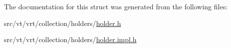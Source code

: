 The documentation for this struct was generated from the following files\+:\begin{DoxyCompactItemize}
\item 
src/vt/vrt/collection/holders/\hyperlink{vrt_2collection_2holders_2holder_8h}{holder.\+h}\item 
src/vt/vrt/collection/holders/\hyperlink{vrt_2collection_2holders_2holder_8impl_8h}{holder.\+impl.\+h}\end{DoxyCompactItemize}
